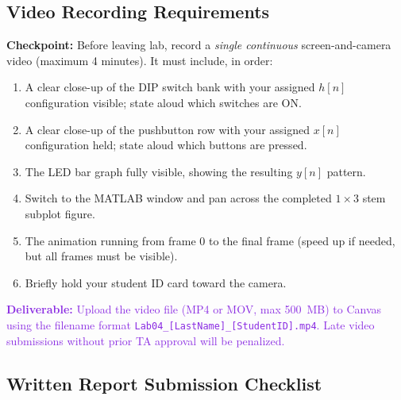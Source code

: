 \documentclass[11pt,letterpaper]{article}
\providecommand{\cpECE}[1]{\textcolor{OliveGreen}{\textbf{Checkpoint:} #1}}
\providecommand{\delECE}[1]{\textcolor{BlueViolet}{\textbf{Deliverable:} #1}}
\begin{document}
\vspace{0.3in}

\subsection{Video Recording Requirements}

\cpECE{Before leaving lab, record a \emph{single continuous} screen-and-camera video (maximum 4 minutes). It must include, in order:}
\begin{enumerate}
    \item A clear close-up of the DIP switch bank with your assigned $h[n]$ configuration visible; state aloud which switches are ON.
    \item A clear close-up of the pushbutton row with your assigned $x[n]$ configuration held; state aloud which buttons are pressed.
    \item The LED bar graph fully visible, showing the resulting $y[n]$ pattern.
    \item Switch to the MATLAB window and pan across the completed $1\times3$ stem subplot figure.
    \item The animation running from frame 0 to the final frame (speed up if needed, but all frames must be visible).
    \item Briefly hold your student ID card toward the camera.
\end{enumerate}

\delECE{Upload the video file (MP4 or MOV, max 500~MB) to Canvas using the filename format \texttt{Lab04\_[LastName]\_[StudentID].mp4}. Late video submissions without prior TA approval will be penalized.}

\subsection{Written Report Submission Checklist}
\end{document}
